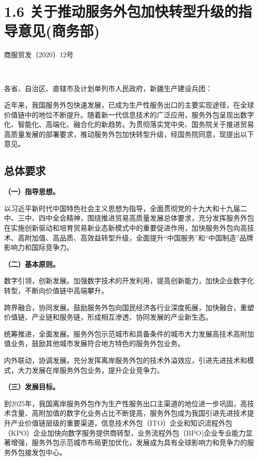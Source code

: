 \chapter{1.6 关于推动服务外包加快转型升级的指导意见(商务部)} %

\begin{center}
  {\small 商服贸发〔2020〕12号}
\end{center}

~\newline

\noindent 各省、自治区、直辖市及计划单列市人民政府，新疆生产建设兵团：

近年来，我国服务外包快速发展，已成为生产性服务出口的主要实现途径，在全球价值链中的地位不断提升。随着新一代信息技术的广泛应用，服务外包呈现出数字化、智能化、高端化、融合化的新趋势。为贯彻落实党中央、国务院关于推进贸易高质量发展的部署要求，推动服务外包加快转型升级，经国务院同意，现提出以下意见。

\section{总体要求}

{ \bf （一）指导思想。 }

以习近平新时代中国特色社会主义思想为指导，全面贯彻党的十九大和十九届二中、三中、四中全会精神，围绕推进贸易高质量发展总体要求，充分发挥服务外包在实施创新驱动和培育贸易新业态新模式中的重要促进作用，加快服务外包向高技术、高附加值、高品质、高效益转型升级，全面提升“中国服务”和“中国制造”品牌影响力和国际竞争力。

{ \bf （二）基本原则。 }

数字引领，创新发展。加强数字技术的开发利用，提高创新能力，加快企业数字化转型，不断向价值链中高端攀升。

跨界融合，协同发展。鼓励服务外包向国民经济各行业深度拓展，加快融合，重塑价值链、产业链和服务链，形成相互渗透、协同发展的产业新生态。

统筹推进，全面发展。服务外包示范城市和具备条件的城市大力发展高技术高附加值业务，鼓励其他城市发展符合地方特色的服务外包业务。

内外联动，协调发展。充分发挥离岸服务外包的技术外溢效应，引进先进技术和模式，大力发展在岸服务外包业务，提升企业竞争力。

{ \bf （三）发展目标。 }

到2025年，我国离岸服务外包作为生产性服务出口主渠道的地位进一步巩固，高技术含量、高附加值的数字化业务占比不断提高，服务外包成为我国引进先进技术提升产业价值链层级的重要渠道，信息技术外包（ITO）企业和知识流程外包（KPO）企业加快向数字服务提供商转型，业务流程外包（BPO)企业专业能力显著增强，服务外包示范城市布局更加优化，发展成为具有全球影响力和竞争力的服务外包接发包中心。

